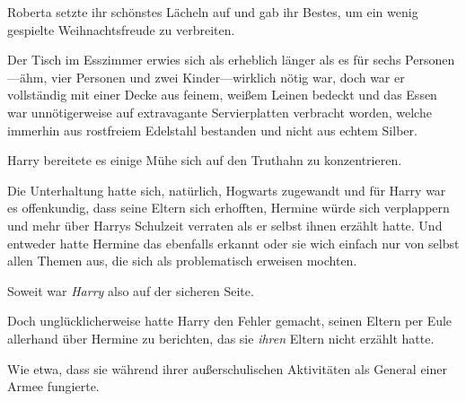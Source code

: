 Roberta setzte ihr schönstes Lächeln auf und gab ihr Bestes, um ein wenig gespielte Weihnachtsfreude zu verbreiten.

\later

Der Tisch im Esszimmer erwies sich als erheblich länger als es für sechs Personen—ähm, vier Personen und zwei Kinder—wirklich nötig war, doch war er vollständig mit einer Decke aus feinem, weißem Leinen bedeckt und das Essen war unnötigerweise auf extravagante Servierplatten verbracht worden, welche immerhin aus rostfreiem Edelstahl bestanden und nicht aus echtem Silber.

Harry bereitete es einige Mühe sich auf den Truthahn zu konzentrieren.

Die Unterhaltung hatte sich, natürlich, Hogwarts zugewandt und für Harry war es offenkundig, dass seine Eltern sich erhofften, Hermine würde sich verplappern und mehr über Harrys Schulzeit verraten als er selbst ihnen erzählt hatte. Und entweder hatte Hermine das ebenfalls erkannt oder sie wich einfach nur von selbst allen Themen aus, die sich als problematisch erweisen mochten.

Soweit war \emph{Harry} also auf der sicheren Seite.

Doch unglücklicherweise hatte Harry den Fehler gemacht, seinen Eltern per Eule allerhand über Hermine zu berichten, das sie \emph{ihren} Eltern nicht erzählt hatte.

Wie etwa, dass sie während ihrer außerschulischen Aktivitäten als General einer Armee fungierte.

